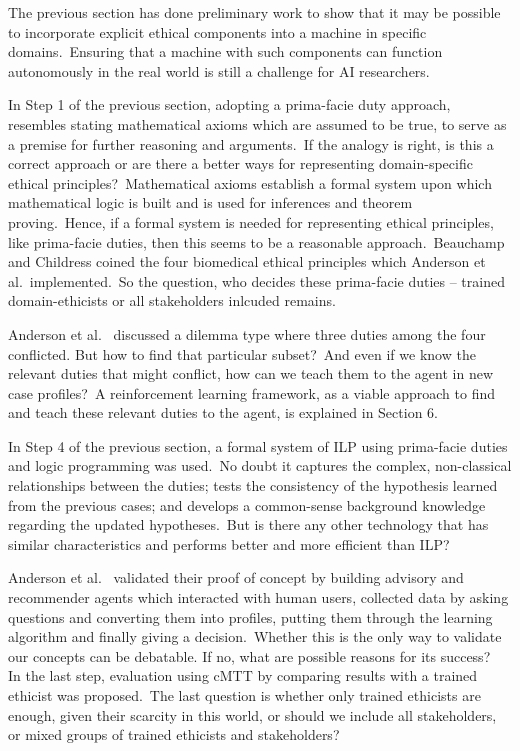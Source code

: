 The previous section has done preliminary work to show that it may be possible to incorporate explicit ethical components into a machine in specific domains.\ Ensuring that a machine with such components can function autonomously in the real world is still a challenge for AI researchers. 

\indent In Step 1 of the previous section, adopting a prima-facie duty approach, resembles stating mathematical axioms which are assumed to be true, to serve as a premise for further reasoning and arguments.\ If the analogy is right, is this a correct approach or are there a better ways for representing domain-specific ethical principles?\ Mathematical axioms establish a formal system upon which mathematical logic is built and is used for inferences and theorem proving.\ Hence, if a formal system is needed for representing ethical principles, like prima-facie duties, then this seems to be a reasonable approach.\ Beauchamp and Childress \cite{beauchamp2001principles} coined the four biomedical ethical principles which Anderson et al.\ implemented.\ So the question, who decides these prima-facie duties -- trained domain-ethicists or all stakeholders inlcuded remains.

\indent Anderson et al.\ \cite{Anderson_Anderson_2007} discussed a dilemma type where three duties among the four conflicted. But how to find that particular subset?\ And even if we know the relevant duties that might conflict, how can we teach them to the agent in new case profiles?\ A reinforcement learning framework, as a viable approach to find and teach these relevant duties to the agent, is explained in Section 6.

\indent In Step 4 of the previous section, a formal system of ILP using prima-facie duties and logic programming was used.\ No doubt it captures the complex, non-classical relationships between the duties; tests the consistency of the hypothesis learned from the previous cases; and develops a common-sense background knowledge regarding the updated hypotheses.\ But is there any other technology that has similar characteristics and performs better and more efficient than ILP?

\indent Anderson et al.\ \cite{Anderson_Anderson_2007} validated their proof of concept by building advisory and recommender agents which interacted with human users, collected data by asking questions and converting them into profiles, putting them through the learning algorithm and finally giving a decision.\ Whether this is the only way to validate our concepts can be debatable. If no, what are possible reasons for its success? \\
\indent In the last step, evaluation using cMTT by comparing results with a trained ethicist was proposed.\ The last question is whether only trained ethicists are enough, given their scarcity in this world, or should we include all stakeholders, or mixed groups of trained ethicists and stakeholders?